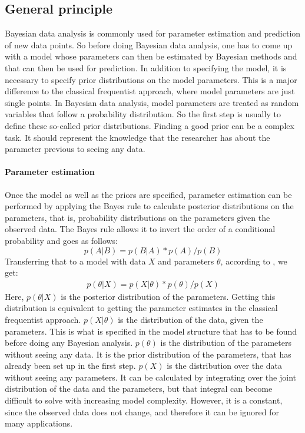 \documentclass{article}
\begin{document}
\subsection{General principle}
\label{subsec: General principle}
Bayesian data analysis is commonly used for parameter estimation and prediction of new data points. So before doing Bayesian data analysis, one has to come up with a model whose parameters can then be estimated by Bayesian methods and that can then be used for prediction. In addition to specifying the model, it is necessary to specify prior distributions on the model parameters. This is a major difference to the classical frequentist approach, where model parameters are just single points. In Bayesian data analysis, model parameters are treated as random variables that follow a probability distribution. So the first step is usually to define these so-called prior distributions. Finding a good prior can be a complex task. It should represent the knowledge that the researcher has about the parameter previous to seeing any data.
\paragraph{Parameter estimation}
Once the model as well as the priors are specified, parameter estimation can be performed by applying the Bayes rule to calculate posterior distributions on the parameters, that is, probability distributions on the parameters given the observed data. The Bayes rule allows it to invert the order of a conditional probability and goes as follows:
\begin{equation}
p(A|B) = p(B|A) * p(A)/p(B)
\end{equation}
Transferring that to a model with data $X$ and parameters $\theta$, according to \cite{1439840954}, we get:
\begin{equation}
\begin{split}
p(\theta|X) = p(X|\theta) * p(\theta)/p(X)
\end{split}
\end{equation}
Here, $p(\theta|X)$ is the posterior distribution of the parameters. Getting this distribution is equivalent to getting the parameter estimates in the classical frequentist approach. $p(X|\theta)$ is the distribution of the data, given the parameters. This is what is specified in the model structure that has to be found before doing any Bayesian analysis. $p(\theta)$ is the distribution of the parameters without seeing any data. It is the prior distribution of the parameters, that has already been set up in the first step. $p(X)$ is the distribution over the data without seeing any parameters. It can be calculated by integrating over the joint distribution of the data and the parameters, but that integral can become difficult to solve with increasing model complexity. However, it is a constant, since the observed data does not change, and therefore it can be ignored for many applications.
\end{document}
